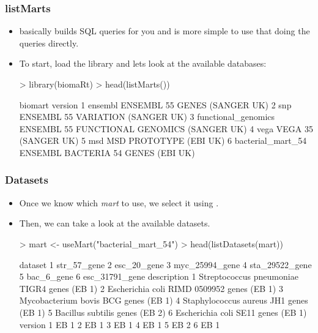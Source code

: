 \begin{frame}
  \frametitle{listMarts}
  \begin{itemize}
  \item {} basically builds SQL queries for you and is more simple to use that doing the queries directly.
  \item To start, load the library and lets look at the available databases: \scriptsize
\begin{Schunk}
\begin{Sinput}
> library(biomaRt)
> head(listMarts())
\end{Sinput}
\begin{Soutput}
              biomart                                    version
1             ensembl               ENSEMBL 55 GENES (SANGER UK)
2                 snp          ENSEMBL 55 VARIATION  (SANGER UK)
3 functional_genomics ENSEMBL 55 FUNCTIONAL GENOMICS (SANGER UK)
4                vega                       VEGA 35  (SANGER UK)
5                 msd                     MSD PROTOTYPE (EBI UK)
6   bacterial_mart_54         ENSEMBL BACTERIA 54 GENES (EBI UK)
\end{Soutput}
\end{Schunk}
  \normalsize
  \end{itemize}
\end{frame}

\begin{frame}
  \frametitle{Datasets}
  \begin{itemize}
  \item Once we know which \emph{mart} to use, we select it using .
  \item Then, we can take a look at the available \alert{datasets}.
\begin{Schunk}
\begin{Sinput}
> mart <- useMart("bacterial_mart_54")
> head(listDatasets(mart))
\end{Sinput}
\begin{Soutput}
         dataset
1    str_57_gene
2    esc_20_gene
3 myc_25994_gene
4 sta_29522_gene
5     bac_6_gene
6 esc_31791_gene
                                  description
1 Streptococcus pneumoniae TIGR4 genes (EB 1)
2  Escherichia coli RIMD 0509952 genes (EB 1)
3        Mycobacterium bovis BCG genes (EB 1)
4      Staphylococcus aureus JH1 genes (EB 1)
5              Bacillus subtilis genes (EB 2)
6          Escherichia coli SE11 genes (EB 1)
  version
1    EB 1
2    EB 1
3    EB 1
4    EB 1
5    EB 2
6    EB 1
\end{Soutput}
\end{Schunk}
  \end{itemize}
\end{frame}

